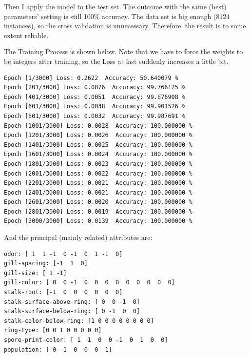 \documentclass[runningheads]{llncs}
\begin{document}
Then I apply the model to the test set. The outcome with the same (best) parameters' setting is still 100\% accuracy. The data set is big enough (8124 instances), so the cross validation is unnecessary. Therefore, the result is to some extent reliable.

The Training Process is shown below. Note that we have to force the weights to be integers after training, so the Loss at last suddenly increases a little bit.
\begin{verbatim}
Epoch [1/3000] Loss: 0.2622  Accuracy: 50.640079 %
Epoch [201/3000] Loss: 0.0076  Accuracy: 99.766125 %
Epoch [401/3000] Loss: 0.0051  Accuracy: 99.876908 %
Epoch [601/3000] Loss: 0.0038  Accuracy: 99.901526 %
Epoch [801/3000] Loss: 0.0032  Accuracy: 99.987691 %
Epoch [1001/3000] Loss: 0.0028  Accuracy: 100.000000 %
Epoch [1201/3000] Loss: 0.0026  Accuracy: 100.000000 %
Epoch [1401/3000] Loss: 0.0025  Accuracy: 100.000000 %
Epoch [1601/3000] Loss: 0.0024  Accuracy: 100.000000 %
Epoch [1801/3000] Loss: 0.0023  Accuracy: 100.000000 %
Epoch [2001/3000] Loss: 0.0022  Accuracy: 100.000000 %
Epoch [2201/3000] Loss: 0.0021  Accuracy: 100.000000 %
Epoch [2401/3000] Loss: 0.0021  Accuracy: 100.000000 %
Epoch [2601/3000] Loss: 0.0020  Accuracy: 100.000000 %
Epoch [2801/3000] Loss: 0.0019  Accuracy: 100.000000 %
Epoch [3000/3000] Loss: 0.0139  Accuracy: 100.000000 %
\end{verbatim}

And the principal (mainly related) attributes are:
\begin{verbatim}
odor: [ 1  1 -1  0 -1  0  1 -1  0]
gill-spacing: [-1  1  0]
gill-size: [ 1 -1]
gill-color: [ 0  0 -1  0  0  0  0  0  0  0  0  0]
stalk-root: [-1  0  0  0  0  0  0]
stalk-surface-above-ring: [ 0  0 -1  0]
stalk-surface-below-ring: [ 0 -1  0  0]
stalk-color-below-ring: [1 0 0 0 0 0 0 0 0]
ring-type: [0 0 1 0 0 0 0 0]
spore-print-color: [ 1  1  0  0 -1  0  1  0  0]
population: [ 0 -1  0  0  0  1]
\end{verbatim}
\end{document}
